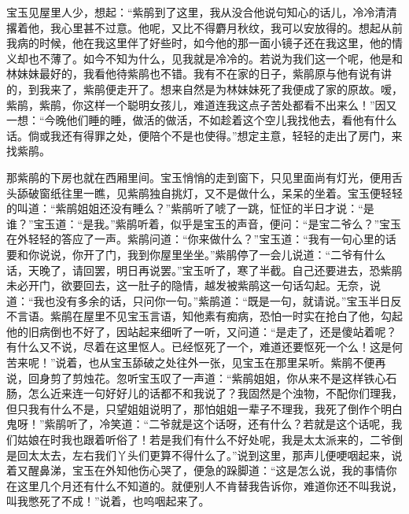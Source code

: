 \begin{parag}
    宝玉见屋里人少，想起：“紫鹃到了这里，我从没合他说句知心的话儿，冷冷清清撂着他，我心里甚不过意。他呢，又比不得麝月秋纹，我可以安放得的。想起从前我病的时候，他在我这里伴了好些时，如今他的那一面小镜子还在我这里，他的情义却也不薄了。如今不知为什么，见我就是冷冷的。若说为我们这一个呢，他是和林妹妹最好的，我看他待紫鹃也不错。我有不在家的日子，紫鹃原与他有说有讲的，到我来了，紫鹃便走开了。想来自然是为林妹妹死了我便成了家的原故。嗳，紫鹃，紫鹃，你这样一个聪明女孩儿，难道连我这点子苦处都看不出来么！”因又一想：“今晚他们睡的睡，做活的做活，不如趁着这个空儿我找他去，看他有什么话。倘或我还有得罪之处，便陪个不是也使得。”想定主意，轻轻的走出了房门，来找紫鹃。
\end{parag}


\begin{parag}
    那紫鹃的下房也就在西厢里间。宝玉悄悄的走到窗下，只见里面尚有灯光，便用舌头舔破窗纸往里一瞧，见紫鹃独自挑灯，又不是做什么，呆呆的坐着。宝玉便轻轻的叫道：“紫鹃姐姐还没有睡么？”紫鹃听了唬了一跳，怔怔的半日才说：“是谁？”宝玉道：“是我。”紫鹃听着，似乎是宝玉的声音，便问：“是宝二爷么？”宝玉在外轻轻的答应了一声。紫鹃问道：“你来做什么？”宝玉道：“我有一句心里的话要和你说说，你开了门，我到你屋里坐坐。”紫鹃停了一会儿说道：“二爷有什么话，天晚了，请回罢，明日再说罢。”宝玉听了，寒了半截。自己还要进去，恐紫鹃未必开门，欲要回去，这一肚子的隐情，越发被紫鹃这一句话勾起。无奈，说道：“我也没有多余的话，只问你一句。”紫鹃道：“既是一句，就请说。”宝玉半日反不言语。紫鹃在屋里不见宝玉言语，知他素有痴病，恐怕一时实在抢白了他，勾起他的旧病倒也不好了，因站起来细听了一听，又问道：“是走了，还是傻站着呢？有什么又不说，尽着在这里怄人。已经怄死了一个，难道还要怄死一个么！这是何苦来呢！”说着，也从宝玉舔破之处往外一张，见宝玉在那里呆听。紫鹃不便再说，回身剪了剪烛花。忽听宝玉叹了一声道：“紫鹃姐姐，你从来不是这样铁心石肠，怎么近来连一句好好儿的话都不和我说了？我固然是个浊物，不配你们理我，但只我有什么不是，只望姐姐说明了，那怕姐姐一辈子不理我，我死了倒作个明白鬼呀！”紫鹃听了，冷笑道：“二爷就是这个话呀，还有什么？若就是这个话呢，我们姑娘在时我也跟着听俗了！若是我们有什么不好处呢，我是太太派来的，二爷倒是回太太去，左右我们丫头们更算不得什么了。”说到这里，那声儿便哽咽起来，说着又醒鼻涕，宝玉在外知他伤心哭了，便急的跺脚道：“这是怎么说，我的事情你在这里几个月还有什么不知道的。就便别人不肯替我告诉你，难道你还不叫我说，叫我憋死了不成！”说着，也呜咽起来了。
\end{parag}


